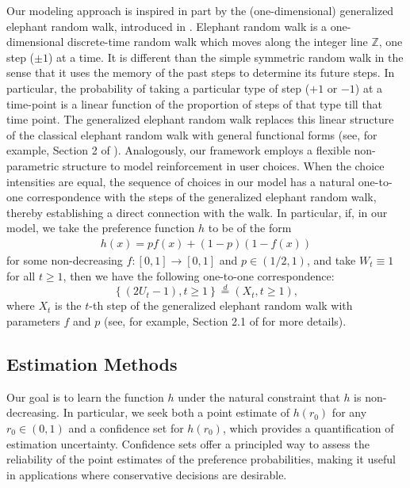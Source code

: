 \documentclass[12pt]{amsart}
\theoremstyle{plain}
\theoremstyle{remark}
\numberwithin{equation}{section}
\begin{document}
Our modeling approach is inspired in part by the (one-dimensional) generalized elephant random walk, introduced in \cite{gerw}. Elephant random walk is a one-dimensional discrete-time random walk which moves along the integer line $\mathbb{Z}$,
one step ($\pm1$) at a time. It is different than the simple symmetric random walk in the sense that it uses the memory
of the past steps to determine its future steps. In particular, the probability of taking a particular type of 
step ($+1$ or $-1$) at a time-point is a linear function of the proportion of steps of that type till that time point. The generalized elephant random walk replaces this linear structure of the classical elephant random walk with general functional forms (see, for example, Section 2 of \cite{gerw}). Analogously, our framework employs a flexible non-parametric structure to model reinforcement in user choices. When the choice intensities are equal, the sequence of choices in our model has a natural one-to-one correspondence with the steps of the generalized elephant random walk, thereby establishing a direct connection with the walk.
In particular, if, in our model, we take the preference function $h$ to be of the form \begin{align}\label{eq:gerwf}h(x) = pf(x) + (1-p)(1-f(x))\end{align} for some non-decreasing $f : [0,1] \to [0,1]$ and $p \in (1/2,1)$, and take $W_t \equiv 1$ for all $t \geq 1$, then we have the following one-to-one correspondence: \[
\left\{(2U_{t}-1) , t \geq 1\right\} \stackrel{d}{=} \left(X_t, t \geq 1\right),\] where $X_t$ is the $t$-th step of 
the generalized elephant random walk with parameters $f$ and $p$ (see, for example, Section 2.1 of \cite{gerw} for more details).

\subsection{Estimation Methods}

Our goal is to learn the function \(h\) under the natural constraint that \(h\) is non-decreasing. In particular, we seek both a {point estimate} of \(h(r_0)\) for any \(r_0\in(0,1)\) and a {confidence set} for \(h(r_0)\), which provides a 
quantification of estimation uncertainty. Confidence sets offer a principled way to assess the reliability of the point estimates of the preference probabilities, making it useful in applications where conservative decisions are desirable.
\end{document}
